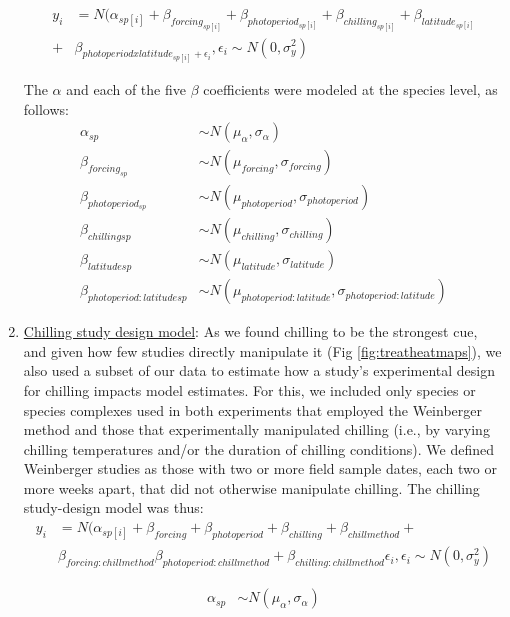 \documentclass{article}
\begin{document}
\begin{enumerate}
\begin{align*}
y_i &= N(\alpha_{sp[i]} + \beta_{forcing_{sp[i]}} + \beta_{photoperiod_{sp[i]}} + \beta_{chilling_{sp[i]}} + \beta_{latitude_{sp[i]}} \\+& \beta_{photoperiod x latitude_{sp[i]} + \epsilon_i},\epsilon_i \sim N(0,\sigma^2_y)
\end{align*}

\noindent The $\alpha$ and each of the five $\beta$ coefficients were modeled at the species level, as follows:
\begin{align*}
\alpha_{sp} &  \sim N(\mu_{\alpha}, \sigma_{\alpha}) \\
\beta_{forcing_{sp}} & \sim N(\mu_{forcing}, \sigma_{forcing}) \\
\beta_{photoperiod_{sp}} & \sim N(\mu_{photoperiod}, \sigma_{photoperiod})\\
\beta_{chilling{sp}} & \sim N(\mu_{chilling}, \sigma_{chilling})\\
\beta_{latitude{sp}} & \sim N(\mu_{latitude}, \sigma_{latitude})\\
\beta_{photoperiod : latitude{sp}} & \sim N(\mu_{photoperiod : latitude}, \sigma_{photoperiod : latitude})
\end{align*}


\item \underline{Chilling study design model}:
As we found chilling to be the strongest cue, and given how few studies directly manipulate it (Fig \ref{fig:treatheatmaps}), we also used a subset of our data to estimate how a study's experimental design for chilling impacts model estimates. For this, we included only species or species complexes used in both experiments that employed the Weinberger method \citep[in this method plant tissue is sequentially removed from the field followed and then exposed to `forcing' conditions, with the assumption that tissues collected later experience more field chilling][]{weinberger1950} and those that experimentally manipulated chilling (i.e., by varying chilling temperatures and/or the duration of chilling conditions). We defined Weinberger studies as those with two or more field sample dates, each two or more weeks apart, that did not otherwise manipulate chilling. The chilling study-design model was thus:
\begin{align*}
y_i &= N(\alpha_{sp[i]} + \beta_{forcing} + \beta_{photoperiod} + \beta_{chilling}+ \beta_{chillmethod} + \\ & \beta_{forcing:chillmethod} \beta_{photoperiod:chillmethod}+ \beta_{chilling:chillmethod} \epsilon_{i}, \epsilon_{i} \sim N(0,\sigma^2_y)
\end{align*}

\begin{align*}
\alpha_{sp} & \sim N(\mu_{\alpha}, \sigma_{\alpha}) \\
\end{align*}

\end{enumerate}
\end{document}
